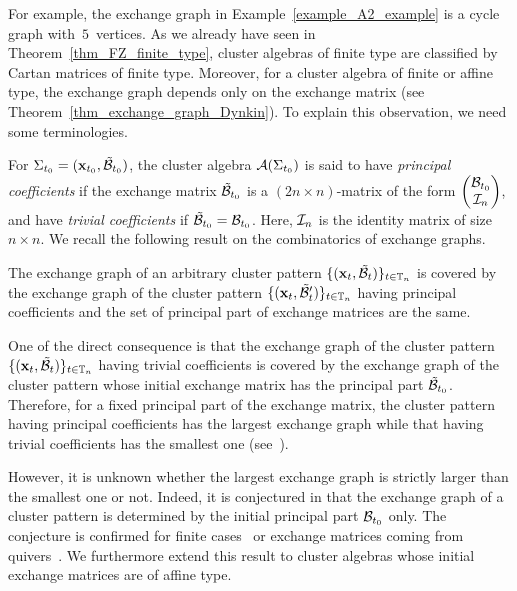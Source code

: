 For example, the exchange graph in Example~\ref{example_A2_example} is a cycle graph with~$5$~vertices. 
As we already have seen in Theorem~\ref{thm_FZ_finite_type}, cluster algebras
of finite type are classified by Cartan matrices of finite type. Moreover,
for a cluster algebra of finite or affine type, the exchange graph depends only on the
exchange matrix (see Theorem~\ref{thm_exchange_graph_Dynkin}). To explain this observation, we need some terminologies.

For $\Sigma_{t_0} = (\mathbf x_{t_0}, \mathcal{\tilde{B}}_{t_0})$,
the cluster algebra $\mathcal{A}(\Sigma_{t_0})$ is said to have \emph{principal coefficients} if the exchange matrix $\mathcal{\tilde{B}}_{t_0}$ is a $(2n \times n)$-matrix of the form $\begin{pmatrix}
\mathcal{B}_{t_0} \\ \mathcal{I}_n
\end{pmatrix}$, and have \emph{trivial coefficients} if $\mathcal{\tilde{B}}_{t_0}=\mathcal{B}_{t_0}$.
Here, $\mathcal{I}_n$ is the identity matrix of size~$n \times n$.
We recall the following result on the combinatorics of exchange graphs.
\begin{theorem}[{\cite[Theorem~4.6]{FZ4_2007}}]\label{thm_exchange_graph_covering}
The exchange graph of an arbitrary cluster pattern $\{(\mathbf{x}_t, \mathcal{\tilde{B}}_t)\}_{t \in \mathbb T_n}$ is covered by the exchange graph of the cluster pattern 
$\{(\mathbf{x}_t, \mathcal{\tilde{B}}_t')\}_{t \in \mathbb T_n}$ having principal coefficients and the set of principal part of exchange matrices are the same. 
\end{theorem}

One of the direct consequence is that the exchange graph of the cluster pattern 
$\{(\mathbf{x}_t, \mathcal{\tilde{B}}_t)\}_{t \in \mathbb T_n}$ having trivial coefficients is covered by the exchange graph of the cluster pattern whose initial exchange matrix has the principal part $\mathcal{\tilde{B}}_{t_0}$.
Therefore, for a fixed principal part of the exchange matrix, the cluster pattern having principal coefficients has the largest exchange graph while that having trivial coefficients has the smallest one (see~\cite[Section~4]{FZ4_2007}).

However, it is unknown whether the largest exchange graph is strictly larger than the smallest one or not. Indeed, it is conjectured in \cite[Conjecture~4.3]{FZ4_2007} that the exchange graph of a cluster pattern is determined by the initial principal part $\mathcal{B}_{t_0}$ only.
The conjecture is confirmed for finite cases~\cite{FZ2_2003} or exchange matrices coming from quivers~\cite{IKLP13}.
We furthermore extend this result to cluster algebras whose initial exchange matrices are of affine type. 

